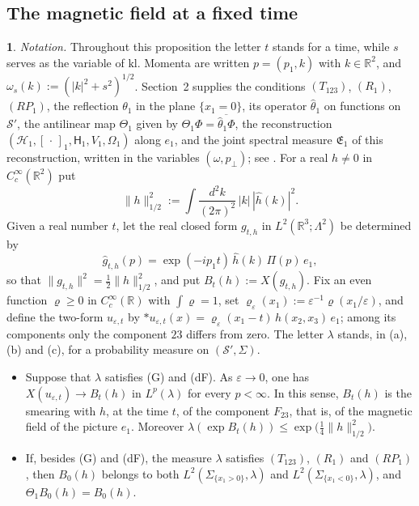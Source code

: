 \documentclass[11pt]{amsart}
\newcommand{\namedhead}{}
\theoremstyle{definition}
\newtheorem*{namedinner}{\namedhead}
\newenvironment{named}[1]{\renewcommand{\namedhead}{#1}\begin{namedinner}}{\end{namedinner}}
\begin{document}
\subsection{The magnetic field at a fixed time}
\begin{named}{Proposition 4.2}
\emph{Notation.}
Throughout this proposition the letter $t$ stands for a time, while $s$ serves as the variable of $\mathrm{kl}$.
Momenta are written $p=(p_1,k)$ with $k\in\mathbb R^2$, and $\omega_s(k):=(|k|^2+s^2)^{1/2}$.
Section~2 supplies the conditions $(T_{123})$, $(R_1)$, $(RP_1)$, the reflection $\theta_1$ in the plane $\{x_1=0\}$, its operator $\hat\theta_1$ on functions on $\mathcal S'$, the antilinear map $\Theta_1$ given by $\Theta_1\Phi=\overline{\hat\theta_1\Phi}$, the reconstruction $(\mathcal H_1,[\,\cdot\,]_1,\mathsf H_1,V_1,\Omega_1)$ along $e_1$, and the joint spectral measure $\mathfrak E_1$ of this reconstruction, written in the variables $(\omega,p_\perp)$; see \cite[Definition~2.38; Lemma~12.18\,(b)]{QEDII}.
For a real $h\ne0$ in $C_c^\infty(\mathbb R^2)$ put
\begin{equation*}
\|h\|_{1/2}^2:=\int\frac{d^2k}{(2\pi)^2}\,|k|\,|\hat h(k)|^2.
\end{equation*}
Given a real number $t$, let the real closed form $g_{t,h}$ in $L^2(\mathbb R^3;\Lambda^2)$ be determined by
\begin{equation*}
\hat g_{t,h}(p)=\exp(-ip_1t)\,\hat h(k)\,\Pi(p)\,e_1,
\end{equation*}
so that $\|g_{t,h}\|^2=\frac12\|h\|_{1/2}^2$, and put $B_t(h):=X(g_{t,h})$.
Fix an even function $\varrho\ge0$ in $C_c^\infty(\mathbb R)$ with $\int\varrho=1$, set $\varrho_\varepsilon(x_1):=\allowbreak \varepsilon^{-1}\varrho(x_1/\varepsilon)$, and define the two-form $u_{\varepsilon,t}$ by $\ast u_{\varepsilon,t}(x)=\allowbreak \varrho_\varepsilon(x_1-t)\,\allowbreak h(x_2,\allowbreak x_3)\,\allowbreak e_1$; among its components only the component $23$ differs from zero.
The letter $\lambda$ stands, in (a), (b) and (c), for a probability measure on $(\mathcal S',\Sigma)$.
\begin{itemize}
\item[(a)] Suppose that $\lambda$ satisfies (G) and (dF).
As $\varepsilon\to0$, one has $X(u_{\varepsilon,t})\to B_t(h)$ in $L^p(\lambda)$ for every $p<\infty$.
In this sense, $B_t(h)$ is the smearing with $h$, at the time $t$, of the component $F_{23}$, that is, of the magnetic field of the picture $e_1$.
Moreover $\lambda(\exp B_t(h))\le\exp\bigl(\frac14\|h\|_{1/2}^2\bigr)$.
\item[(b)] If, besides (G) and (dF), the measure $\lambda$ satisfies $(T_{123})$, $(R_1)$ and $(RP_1)$, then $B_0(h)$ belongs to both $L^2(\Sigma_{\{x_1>0\}},\lambda)$ and $L^2(\Sigma_{\{x_1<0\}},\lambda)$, and $\Theta_1B_0(h)=B_0(h)$.

\end{itemize}
\end{named}
\end{document}
